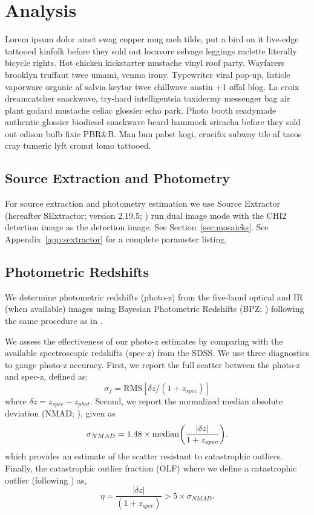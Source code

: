 \documentclass[apj, revtex4]{emulateapj}
\begin{document}
\section{Analysis}\label{sec:analysis}
Lorem ipsum dolor amet swag copper mug meh tilde, put a bird on it live-edge tattooed kinfolk before they sold out locavore selvage leggings raclette literally bicycle rights. Hot chicken kickstarter mustache vinyl roof party. Wayfarers brooklyn truffaut twee umami, venmo irony. Typewriter viral pop-up, listicle vaporware organic af salvia keytar twee chillwave austin +1 offal blog. La croix dreamcatcher snackwave, try-hard intelligentsia taxidermy messenger bag air plant godard mustache celiac glossier echo park. Photo booth readymade authentic glossier biodiesel snackwave beard hammock sriracha before they sold out edison bulb fixie PBR\&B. Man bun pabst kogi, crucifix subway tile af tacos cray tumeric lyft cronut lomo tattooed.

\subsection{Source Extraction and Photometry}
For source extraction and photometry estimation we use Source Extractor (hereafter SExtractor; version 2.19.5; \citealt{Bertin1996}) run dual image mode with the CHI2 detection image as the detection image. See Section~\ref{sec:mosaicks}. See Appendix~\ref{app:sextractor} for a complete parameter listing.

\subsection{Photometric Redshifts}
We determine photometric redshifts (photo-z) from the five-band optical and IR (when available) images using Bayesian Photometric Redshifts (BPZ; \citealt{Benitez2000, Coe2006}) following the same procedure as in \cite{Menanteau2009a}.

We assess the effectiveness of our photo-z estimates by comparing with the available spectroscopic redshifts (spec-z) from the SDSS. We use three diagnostics to gauge photo-z accuracy. First, we report the full scatter between the photo-z and spec-z, defined as:
\begin{equation}
	\sigma_f = \mathrm{RMS}[\delta z/(1+z_{spec})]
\end{equation}
where $\delta z = z_{spec} - z_{phot}$. Second, we report the normalized median absolute deviation (NMAD; \citealt{Ilbert2009, Dahlen2013, Molino2017}), given as
\begin{equation}
	\sigma_{NMAD} = 1.48 \times \mathrm{median} \bigg{(} \frac{|\delta z|}{1+z_{spec}} \bigg{)}.
\end{equation}   
which provides an estimate of the scatter resistant to catastrophic outliers. Finally, the catastrophic outlier fraction (OLF) where we define a catastrophic outlier (following \citealt{Molino2017}) as,
\begin{equation}
	\eta = \frac{|\delta z|}{(1+z_{spec})} > 5 \times \sigma_{NMAD}.
\end{equation}
\end{document}

